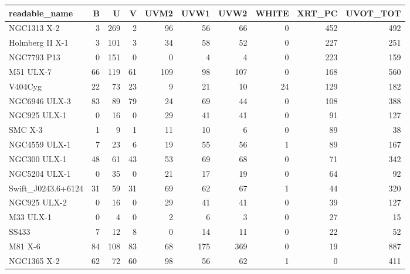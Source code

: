 \begin{tabular}{lrrrrrrrrr}
\toprule
     readable\_name &  B &   U &  V &  UVM2 &  UVW1 &  UVW2 &  WHITE &  XRT\_PC &  UVOT\_TOT \\
\midrule
       NGC1313 X-2 &  3 & 269 &  2 &    96 &    56 &    66 &      0 &     452 &       492 \\
   Holmberg II X-1 &  3 & 101 &  3 &    34 &    58 &    52 &      0 &     227 &       251 \\
       NGC7793 P13 &  0 & 151 &  0 &     0 &     4 &     4 &      0 &     223 &       159 \\
         M51 ULX-7 & 66 & 119 & 61 &   109 &    98 &   107 &      0 &     168 &       560 \\
           V404Cyg & 22 &  73 & 23 &     9 &    21 &    10 &     24 &     129 &       182 \\
     NGC6946 ULX-3 & 83 &  89 & 79 &    24 &    69 &    44 &      0 &     108 &       388 \\
      NGC925 ULX-1 &  0 &  16 &  0 &    29 &    41 &    41 &      0 &      91 &       127 \\
           SMC X-3 &  1 &   9 &  1 &    11 &    10 &     6 &      0 &      89 &        38 \\
     NGC4559 ULX-1 &  7 &  23 &  6 &    19 &    55 &    56 &      1 &      89 &       167 \\
      NGC300 ULX-1 & 48 &  61 & 43 &    53 &    69 &    68 &      0 &      71 &       342 \\
     NGC5204 ULX-1 &  0 &  35 &  0 &    21 &    17 &    19 &      0 &      64 &        92 \\
Swift\_J0243.6+6124 & 31 &  59 & 31 &    69 &    62 &    67 &      1 &      44 &       320 \\
      NGC925 ULX-2 &  0 &  16 &  0 &    29 &    41 &    41 &      0 &      39 &       127 \\
         M33 ULX-1 &  0 &   4 &  0 &     2 &     6 &     3 &      0 &      27 &        15 \\
             SS433 &  7 &  12 &  8 &     0 &    14 &    11 &      0 &      22 &        52 \\
           M81 X-6 & 84 & 108 & 83 &    68 &   175 &   369 &      0 &      19 &       887 \\
       NGC1365 X-2 & 62 &  72 & 60 &    98 &    56 &    62 &      1 &       0 &       411 \\
\bottomrule
\end{tabular}
